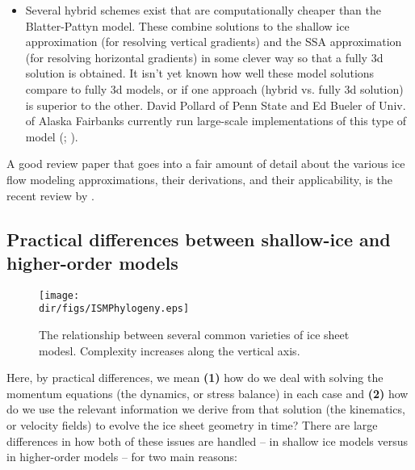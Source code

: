 \begin{itemize}
\item Several hybrid schemes exist that are computationally cheaper than the Blatter-Pattyn model. These combine solutions to the shallow ice approximation (for resolving vertical gradients) and the SSA approximation (for resolving horizontal gradients) in some clever way so that a fully 3d solution is obtained. It isn't yet known how well these model solutions compare to fully 3d models, or if one approach (hybrid vs. fully 3d solution) is superior to the other. David Pollard of Penn State and Ed Bueler of Univ. of Alaska Fairbanks currently run large-scale implementations of this type of model (\citet{Bueler:2009ee}; \citet{Pollard:2009ed}).
\end{itemize}

A good review paper that goes into a fair amount of detail about the various ice flow modeling approximations, their derivations, and their applicability, is the recent review by \citet{Schoof:2013is}.

\subsection{Practical differences between shallow-ice and higher-order models}

\begin{figure}
  \begin{center}
    \texttt{[image: \\dir/figs/ISMPhylogeny.eps]}
   \end{center}
  \caption{The relationship between several common varieties of ice sheet modesl. Complexity increases along the vertical axis.}
   \label{fig:phylogeny}
\end{figure} 

Here, by practical differences, we mean \textbf{(1)} how do we deal with solving the momentum equations (the dynamics, or stress balance) in each case and \textbf{(2)} how do we use the relevant information we derive from that solution (the kinematics, or velocity fields) to evolve the ice sheet geometry in time? There are large differences in how both of these issues are handled -- in shallow ice models versus in higher-order models -- for two main reasons:

